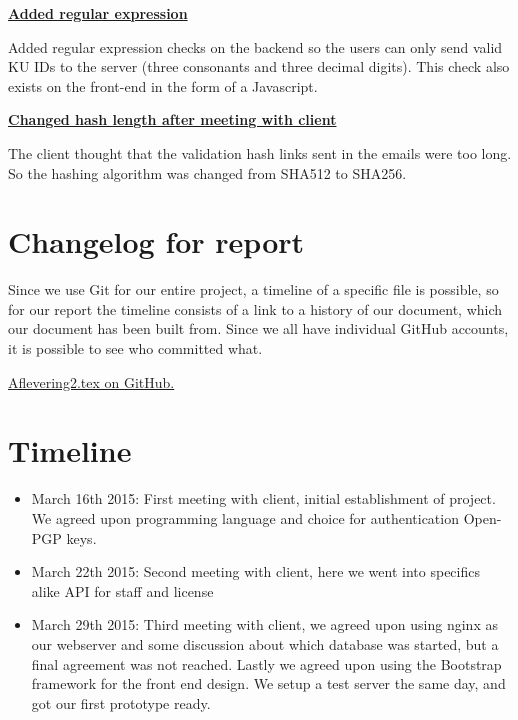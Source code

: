 \documentclass[11pt,a4paper]{report}
\begin{document}
\begin{appendices}
\href{https://github.com/Orkeren/DIKU-Keyserver/commit/09610ad45946dddbcf73c5db870eae36a591e0ef}{\textbf{Added regular expression}}

Added regular expression checks on the backend so the users can only send valid KU IDs to the server (three consonants and three decimal digits). This check also exists on the front-end in the form of a Javascript.

\href{https://github.com/Orkeren/DIKU-Keyserver/commit/a75d93cb59f7c662260f76104f2bb739c9390fce}{\textbf{Changed hash length after meeting with client}}

The client thought that the validation hash links sent in the emails were too long. So the hashing algorithm was changed from SHA512 to SHA256.

\chapter{Changelog for report}

Since we use Git for our entire project, a timeline of a specific file is possible, so for our report the timeline consists of a link to a history of our document, which our document has been built from. Since we all have individual GitHub accounts, it is possible to see who committed what.

\href{https://github.com/Orkeren/DIKU-Keyserver/commits/master/docs/delrapport_2/aflevering2.tex}{Aflevering2.tex on GitHub.}


\chapter{Timeline}
\begin{itemize}
  \item  March 16th 2015: First meeting with client, initial establishment of project. We agreed upon programming language and choice for authentication Open-PGP keys.
  \item  March 22th 2015: Second meeting with client, here we went into specifics alike API for staff and license
  \item March 29th 2015: Third meeting with client, we agreed upon using nginx as our webserver and some discussion about which database was started, but a final agreement was not reached. Lastly we agreed upon using the Bootstrap framework for the front end design. We setup a test server the same day, and got our first prototype ready.
\end{itemize}


\end{appendices}
\end{document}
